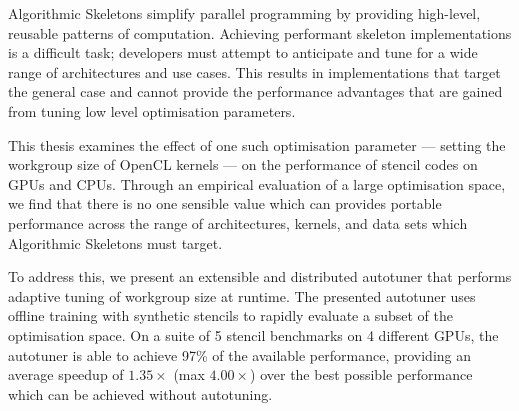 Algorithmic Skeletons simplify parallel programming by providing
high-level, reusable patterns of computation. Achieving performant
skeleton implementations is a difficult task; developers must attempt
to anticipate and tune for a wide range of architectures and use
cases. This results in implementations that target the general case
and cannot provide the performance advantages that are gained from
tuning low level optimisation parameters.

This thesis examines the effect of one such optimisation parameter ---
setting the workgroup size of OpenCL kernels --- on the performance of
stencil codes on GPUs and CPUs. Through an empirical evaluation of a
large optimisation space, we find that there is no one sensible value
which can provides portable performance across the range of
architectures, kernels, and data sets which Algorithmic Skeletons must
target.

To address this, we present an extensible and distributed autotuner
that performs adaptive tuning of workgroup size at runtime. The
presented autotuner uses offline training with synthetic stencils to
rapidly evaluate a subset of the optimisation space. On a suite of 5
stencil benchmarks on 4 different GPUs, the autotuner is able to
achieve 97\% of the available performance, providing an average
speedup of $1.35\times$ (max $4.00\times$) over the best possible
performance which can be achieved without autotuning.

